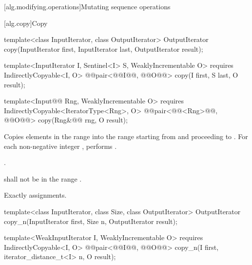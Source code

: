 [alg.modifying.operations]{Mutating sequence operations}

[alg.copy]{Copy}

%
\begin{removedblock}
\begin{itemdecl}
template<class InputIterator, class OutputIterator>
  OutputIterator copy(InputIterator first, InputIterator last,
                      OutputIterator result);
\end{itemdecl}
\end{removedblock}
\begin{addedblock}
\begin{itemdecl}
template<InputIterator I, Sentinel<I> S, WeaklyIncrementable O>
  requires IndirectlyCopyable<I, O>
  @@pair<@@I@\newtxt{)}@, @@O@\newtxt{)}@>
    copy(I first, S last, O result);

template<Input@@ Rng, WeaklyIncrementable O>
  requires IndirectlyCopyable<IteratorType<Rng>, O>
  @@pair<@@<Rng>@\newtxt{)}@, @@O@\newtxt{)}@>
    copy(Rng&@\newtxt{\&}@ rng, O result);
\end{itemdecl}
\end{addedblock}

\begin{itemdescr}
\pnum
\effects Copies elements in the range  into the range
 starting from  and
proceeding to . For each non-negative integer
, performs .

\pnum
\returns {}.

\pnum
\requires {} shall not be in the range .

\pnum
\complexity Exactly  assignments.
\end{itemdescr}

%
\begin{removedblock}
\begin{itemdecl}
template<class InputIterator, class Size, class OutputIterator>
  OutputIterator copy_n(InputIterator first, Size n,
                        OutputIterator result);
\end{itemdecl}
\end{removedblock}
\begin{addedblock}
\begin{itemdecl}
template<WeakInputIterator I, WeaklyIncrementable O>
  requires IndirectlyCopyable<I, O>
  @@pair<@@I@\newtxt{)}@, @@O@\newtxt{)}@>
    copy_n(I first, iterator_distance_t<I> n, O result);
\end{itemdecl}
\end{addedblock}

